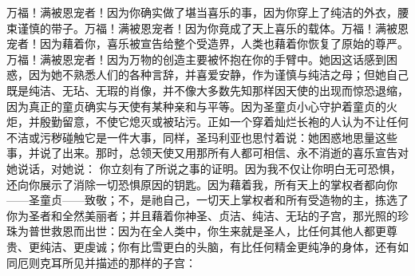 万福！满被恩宠者！因为你确实做了堪当喜乐的事，因为你穿上了纯洁的外衣，腰束谨慎的带子。万福！满被恩宠者！因为你竟成了天上喜乐的载体。万福！满被恩宠者！因为藉着你，喜乐被宣告给整个受造界，人类也藉着你恢复了原始的尊严。万福！满被恩宠者！因为万物的创造主要被怀抱在你的手臂中。她因这话感到困惑，因为她不熟悉人们的各种言辞，并喜爱安静，作为谨慎与纯洁之母；但她自己既是纯洁、无玷、无瑕的肖像，并不像大多数先知那样因天使的出现而惊恐退缩，因为真正的童贞确实与天使有某种亲和与平等。因为圣童贞小心守护着童贞的火炬，并殷勤留意，不使它熄灭或被玷污。正如一个穿着灿烂长袍的人认为不让任何不洁或污秽碰触它是一件大事，同样，圣玛利亚也思忖着说：她困惑地思量这些事，并说了出来。那时，总领天使又用那所有人都可相信、永不消逝的喜乐宣告对她说话，对她说： 你立刻有了所说之事的证明。因为我不仅让你明白无可恐惧，还向你展示了消除一切恐惧原因的钥匙。因为藉着我，所有天上的掌权者都向你——圣童贞——致敬；不，是祂自己，一切天上掌权者和所有受造物的主，拣选了你为圣者和全然美丽者；并且藉着你神圣、贞洁、纯洁、无玷的子宫，那光照的珍珠为普世救恩而出世：因为在全人类中，你生来就是圣人，比任何其他人都更尊贵、更纯洁、更虔诚；你有比雪更白的头脑，有比任何精金更纯净的身体，还有如同厄则克耳所见并描述的那样的子宫：\par

